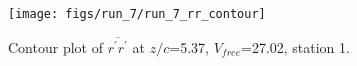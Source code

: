 \begin{figure}[H]
\centering
\texttt{[image: figs/run\_7/run\_7\_rr\_contour]}
\caption{Contour plot of $\overline{r^\prime r^\prime}$ at $z/c$=5.37, $V_{free}$=27.02, station 1.}
\label{fig:run_7_rr_contour}
\end{figure}


